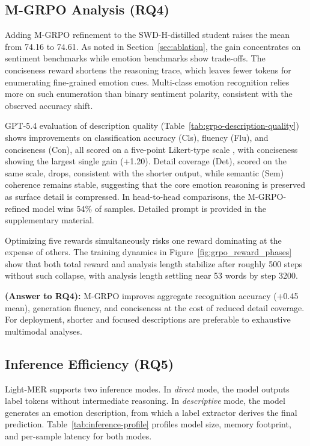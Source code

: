 \documentclass[sigconf]{acmart}
\begin{document}
\subsection{M-GRPO Analysis (RQ4)}
\label{sec:mgrpo}

Adding M-GRPO refinement to the SWD-H-distilled student raises the mean from 74.16 to 74.61. As noted in Section~\ref{sec:ablation}, the gain concentrates on sentiment benchmarks while emotion benchmarks show trade-offs. The conciseness reward shortens the reasoning trace, which leaves fewer tokens for enumerating fine-grained emotion cues. Multi-class emotion recognition relies more on such enumeration than binary sentiment polarity, consistent with the observed accuracy shift.

GPT-5.4 evaluation of description quality (Table~\ref{tab:grpo-description-quality}) shows improvements on classification accuracy (Cls), fluency (Flu), and conciseness (Con), all scored on a five-point Likert-type scale \cite{Likert}, with conciseness showing the largest single gain (+1.20). Detail coverage (Det), scored on the same scale, drops, consistent with the shorter output, while semantic (Sem) coherence remains stable, suggesting that the core emotion reasoning is preserved as surface detail is compressed. In head-to-head comparisons, the M-GRPO-refined model wins 54\% of samples. Detailed prompt is provided in the supplementary material.

Optimizing five rewards simultaneously risks one reward dominating at the expense of others. The training dynamics in Figure~\ref{fig:grpo_reward_phases} show that both total reward and analysis length stabilize after roughly 500 steps without such collapse, with analysis length settling near 53 words by step 3200. 

\textbf{(Answer to RQ4):} M-GRPO improves aggregate recognition accuracy (+0.45 mean), generation fluency, and conciseness at the cost of reduced detail coverage. For deployment, shorter and focused descriptions are preferable to exhaustive multimodal analyses.

\subsection{Inference Efficiency (RQ5)}
\label{sec:efficiency}

Light-MER supports two inference modes. In \emph{direct} mode, the model outputs label tokens without intermediate reasoning. In \emph{descriptive} mode, the model generates an emotion description, from which a label extractor derives the final prediction. Table~\ref{tab:inference-profile} profiles model size, memory footprint, and per-sample latency for both modes.
\end{document}

